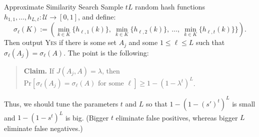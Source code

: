 \begin{solution}{Approximate Similarity Search}
    Sample $tL$ random hash functions $h_{1, 1}, \dots, h_{L, t}: \mathcal{U} \to [0, 1]$, and define:
    \[ \sigma_{\ell}(K) := \left( \underset{k \in K}{\min} \{ h_{\ell, 1}(k) \}, \ \underset{k \in K}{\min} \{ h_{\ell, 2}(k) \}, \ \dots, \ \underset{k \in K}{\min} \{ h_{\ell, t}(k) \} \} \right). \]
    Then output \textsc{Yes} if there is some set $A_j$ and some $1 \leq \ell \leq L$ such that $\sigma_{\ell}(A_j) = \sigma_{\ell}(A)$.  The point is the following:
    \begin{quote}
        \textbf{Claim.} If $J(A_j, A) = \lambda$, then $\mathrm{Pr}[\sigma_{\ell}(A_j) = \sigma_{\ell}(A) \text{ for some } \ell] \geq 1 - (1 - \lambda^t)^L$. 
    \end{quote}
    Thus, we should tune the parameters $t$ and $L$ so that $1 - (1 - (s')^t)^L$ is small and $1 - (1 - s^t)^L$ is big.  (Bigger $t$ eliminate false positives, whereas bigger $L$ eliminate false negatives.)
\end{solution}

